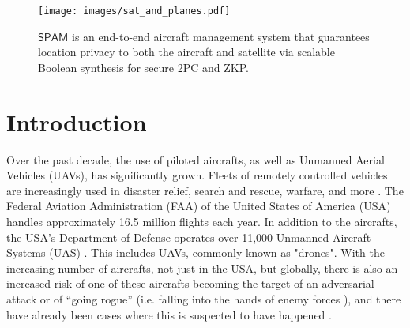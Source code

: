 \documentclass[9pt,sigconf,screen]{acmart}
\newcommand{\nojan}[1]{\textcolor{red}{{\sf (NS:} {\sl{#1})}}}
\newcommand{\yaman}[1]{\textcolor{blue}{{\sf (YJ:} {\sl{#1})}}}
\newcommand{\nasimeh}[1]{\textcolor{purple}{{\sf (NH:} {\sl{#1})}}}
\newcommand\sys{$\mathsf{SPAM}$\xspace}
\begin{document}




\maketitle

\begin{figure}[h]
  \centering
  \texttt{[image: images/sat\_and\_planes.pdf]}
  \caption{\sys is an end-to-end aircraft management system that guarantees location privacy to both the aircraft and satellite via scalable Boolean synthesis for secure 2PC and ZKP.}
\end{figure}

\section{Introduction}
Over the past decade, the use of piloted aircrafts, as well as Unmanned Aerial Vehicles (UAVs), has significantly grown. Fleets of remotely controlled vehicles are increasingly used in disaster relief, search and rescue, warfare, and more \cite{disRelief, searchAndRescue}. The Federal Aviation Administration (FAA) of the United States of America (USA) handles approximately 16.5 million flights each year. In addition to the aircrafts, the USA’s Department of Defense operates over 11,000 Unmanned Aircraft Systems (UAS) \cite{dod}. This includes UAVs, commonly known as "drones". With the increasing number of aircrafts, not just in the USA, but globally, there is also an increased risk of one of these aircrafts  becoming the target of an adversarial attack or of “going rogue” (i.e. falling into the hands of enemy forces \cite{rogueNations}), and there have already been cases where this is suspected to have happened \cite{hartmann}. 
\end{document}
